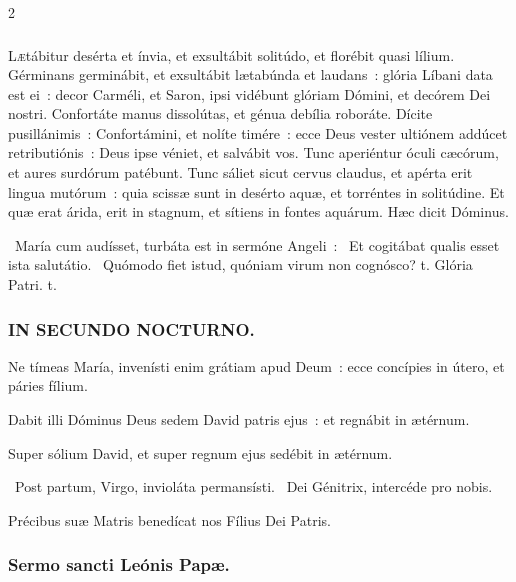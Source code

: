 \documentclass[9pt,twoside]{extarticle}
\begin{document}
\begin{multicols}{2}
\subsubsection*{}
\lettrine{L}ætábitur desérta et ínvia, et exsultábit solitúdo, et florébit quasi lílium.
Gérminans germinábit, et exsultábit lætabúnda et laudans~: glória Líbani data est ei~: decor Carméli, et Saron, ipsi vidébunt glóriam Dómini, et decórem Dei nostri.
Confortáte manus dissolútas, et génua debília roboráte.
Dícite pusillánimis~: Confortámini, et nolíte timére~: ecce Deus vester ultiónem addúcet retributiónis~: Deus ipse véniet, et salvábit vos.
Tunc aperiéntur óculi cæcórum, et aures surdórum patébunt.
Tunc sáliet sicut cervus claudus, et apérta erit lingua mutórum~: quia scissæ sunt in desérto aquæ, et torréntes in solitúdine.
Et quæ erat árida, erit in stagnum, et sítiens in fontes aquárum. Hæc dicit Dóminus.

\begin{tightlist}{}
\item {}~María cum audísset, turbáta est in sermóne Angeli~: \textred{*}~Et cogitábat qualis esset ista salutátio. ~Quómodo fiet istud, quóniam virum non cognósco? t. Glória Patri. t.
\end{tightlist}

\subsubsection*{\center \textsc{IN SECUNDO NOCTURNO.}}
\begin{tightlist}{}
\item {} Ne tímeas María, invenísti enim grátiam apud Deum~: ecce concípies in útero, et páries fílium.
\item {} Dabit illi Dóminus Deus sedem David patris ejus~: et regnábit in ætérnum.
\item {} Super sólium David, et super regnum ejus sedébit in ætérnum.
\item {}~Post partum, Virgo, invioláta permansísti. ~Dei Génitrix, intercéde pro nobis.
\item {\small {} Précibus suæ Matris benedícat nos Fílius Dei Patris.}
\end{tightlist}

\subsubsection*{\center Sermo sancti Leónis Papæ.}

\end{multicols}
\end{document}
